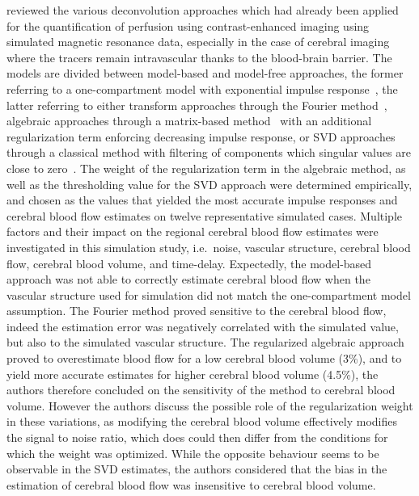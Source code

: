 \citet{ostergaard:1996gt} reviewed the various deconvolution approaches which had already been applied for the quantification of perfusion using contrast-enhanced imaging using simulated magnetic resonance data, especially in the case of cerebral imaging where the tracers remain intravascular thanks to the blood-brain barrier.
The models are divided between model-based and model-free approaches, the former referring to a one-compartment model with exponential impulse response~\cite{Faddy:1987kl}, the latter referring to either transform approaches through the Fourier method~\cite{Coulam:1966un}, algebraic approaches through a matrix-based method~\cite{Valentinuzzi:1975tr} with an additional regularization term enforcing decreasing impulse response, or SVD approaches through a classical method with filtering of components which singular values are close to zero~\cite{Diffey:1976tk}.
The weight of the regularization term in the algebraic method, as well as the thresholding value for the SVD approach were determined empirically, and chosen as the values that yielded the most accurate impulse responses and cerebral blood flow estimates on twelve representative simulated cases.
Multiple factors and their impact on the regional cerebral blood flow estimates were investigated in this simulation study, i.e.~noise, vascular structure, cerebral blood flow, cerebral blood volume, and time-delay.
Expectedly, the model-based approach was not able to correctly estimate cerebral blood flow when the vascular structure used for simulation did not match the one-compartment model assumption.
The Fourier method proved sensitive to the cerebral blood flow, indeed the estimation error was negatively correlated with the simulated value, but also to the simulated vascular structure.
The regularized algebraic approach proved to overestimate blood flow for a low cerebral blood volume (3\%), and to yield more accurate estimates for higher cerebral blood volume (4.5\%), the authors therefore concluded on the sensitivity of the method to cerebral blood volume.
However the authors discuss the possible role of the regularization weight in these variations, as modifying the cerebral blood volume effectively modifies the signal to noise ratio, which does could then differ from the conditions for which the weight was optimized.
While the opposite behaviour seems to be observable in the SVD estimates, the authors considered that the bias in the estimation of cerebral blood flow was insensitive to cerebral blood volume. 
